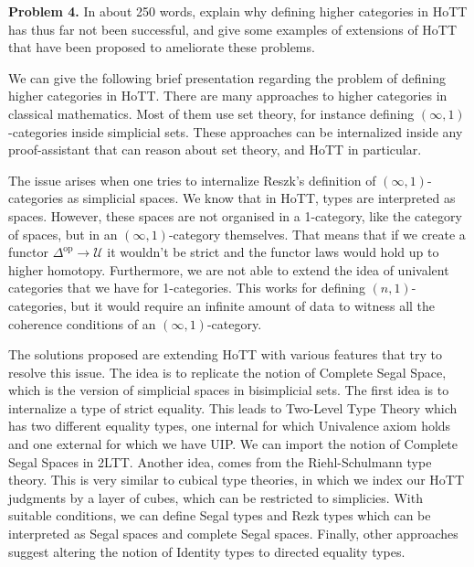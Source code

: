 \documentclass{article}
\theoremstyle{definition}
\newcommand{\opF}[1]{{#1}^{\mathrm{op}}}
\begin{document}
\pagebreak

\noindent\textbf{Problem 4.} In about 250 words, explain why defining higher categories in HoTT has thus far not been successful, and give some examples of extensions of HoTT that have been proposed to ameliorate these problems.

We can give the following brief presentation 
regarding the problem of defining higher categories
in HoTT. There are many approaches to higher
categories in classical mathematics. Most of
them use set theory, for instance
defining $(\infty, 1)$-categories inside
simplicial sets. These approaches can be
internalized inside any proof-assistant that
can reason about set theory, and HoTT in
particular.

The issue arises when one tries to internalize
Reszk's definition of $(\infty, 1)$-categories
as simplicial spaces. We know that in HoTT,
types are interpreted as spaces. However,
these spaces are not organised in a 1-category,
like the category of spaces, but in an
$(\infty,1)$-category themselves. That means
that if we create a functor
$\opF{\Delta} \to \mathcal{U}$ it wouldn't be
strict and the functor laws would hold up to
higher homotopy. Furthermore, we are not
able to extend the idea of univalent categories
that we have for 1-categories. This works
for defining $(n,1)$-categories, but it would
require an infinite amount of data to
witness all the coherence conditions of an
$(\infty, 1)$-category.

The solutions proposed are extending HoTT
with various features that try to resolve this
issue. The idea is to replicate the notion
of Complete Segal Space, which is the version
of simplicial spaces in bisimplicial sets.
The first idea is to internalize a
type of strict equality. This leads to Two-Level
Type Theory which has two different equality
types, one internal for which Univalence axiom
holds and one external for which we have UIP.
We can import the notion of Complete Segal
Spaces in 2LTT. Another idea, comes from the
Riehl-Schulmann type theory. This is very similar
to cubical type theories, in which we index
our HoTT judgments by a layer of cubes, which
can be restricted to simplicies. With suitable
conditions, we can define Segal types and
Rezk types which can be interpreted as Segal
spaces and complete Segal spaces. Finally,
other approaches suggest altering the notion
of Identity types to directed equality types.
\end{document}
